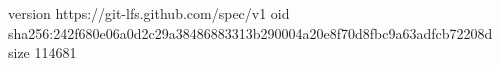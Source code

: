 version https://git-lfs.github.com/spec/v1
oid sha256:242f680e06a0d2c29a38486883313b290004a20e8f70d8fbc9a63adfcb72208d
size 114681
